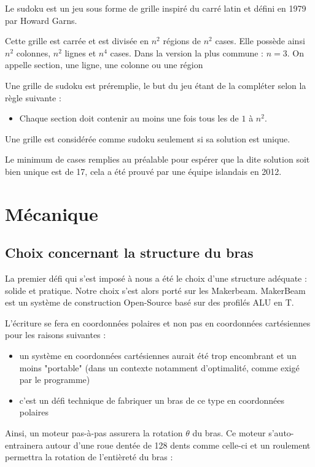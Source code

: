 \documentclass[12pt,a4paper]{report}
\begin{document}
	Le sudoku est un jeu sous forme de grille inspiré du carré latin et défini en 1979 par Howard Garns.
	
	Cette grille est carrée et est divisée en $n^2$ régions de $n^2$ cases. Elle possède ainsi $n^2$ colonnes, $n^2$ lignes et $n^4$ cases. Dans la version la plus commune : $n=3$. On appelle section, une ligne, une colonne ou une région

Une grille de sudoku est préremplie, le but du jeu étant de la compléter selon la règle suivante :
\begin{itemize}[label=--]
\item Chaque section doit contenir au moins une fois tous les de $1$ à $n^2$.
\end{itemize} 

Une grille est considérée comme sudoku seulement si sa solution est unique.

Le minimum de cases remplies au préalable pour espérer que la dite solution soit bien unique est de 17, cela a été prouvé par une équipe islandais en 2012.

	\chapter{Mécanique}
	\section{Choix concernant la structure du bras}
	La premier défi qui s'est imposé à nous a été le choix d'une structure adéquate : solide et pratique. Notre choix s'est alors porté sur les Makerbeam. MakerBeam est un système de construction Open-Source basé sur des profilés ALU en T.
	
	L'écriture se fera en coordonnées polaires et non pas en coordonnées cartésiennes pour les raisons suivantes :
	\begin{itemize}[label=--]
	\item un système en coordonnées cartésiennes aurait été trop encombrant et un moins "portable" (dans un contexte notamment d'optimalité, comme exigé par le programme)
	\item c'est un défi technique de fabriquer un bras de ce type en coordonnées polaires
	\end{itemize}
	
Ainsi, un moteur pas-à-pas assurera la rotation $\theta$ du bras. Ce moteur s'auto-entrainera autour d'une roue dentée de 128 dents comme celle-ci et un roulement permettra la rotation de l'entièreté du bras :
\end{document}
